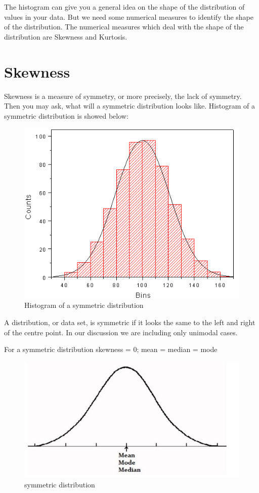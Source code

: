 \documentclass[
]{book}
\begin{document}
The histogram can give you a general idea on the shape of the distribution of values in your data. But we need some numerical measures to identify the shape of the distribution. The numerical measures which deal with the shape of the distribution are Skewness and Kurtosis.

\section{Skewness}\label{skewness}

Skewness is a measure of symmetry, or more precisely, the lack of symmetry. Then you may ask, what will a symmetric distribution looks like. Histogram of a symmetric distribution is showed below:

\begin{figure}

{\centering \includegraphics[width=0.5\linewidth]{images/Hist1} 

}

\caption{Histogram of a symmetric distribution}\label{fig:hs}
\end{figure}

A distribution, or data set, is symmetric if it looks the same to the left and right of the centre point. In our discussion we are including only unimodal cases.

For a symmetric distribution skewness = 0; mean = median = mode

\begin{figure}

{\centering \includegraphics[width=0.5\linewidth]{images/image3_5} 

}

\caption{symmetric distribution}\label{fig:hs1}
\end{figure}
\end{document}
